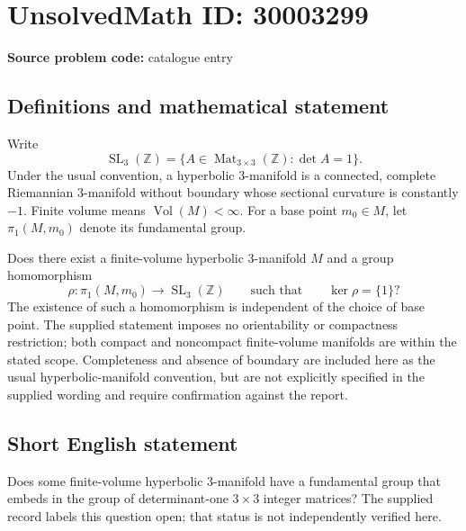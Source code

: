 \documentclass[11pt]{article}
\newcommand{\Z}{\mathbb{Z}}
\begin{document}
\section*{UnsolvedMath ID: 30003299}
\textbf{Source problem code:} catalogue entry
\subsection{Definitions and mathematical statement}
Write
\[
\operatorname{SL}_3(\Z)=\{A\in\operatorname{Mat}_{3\times3}(\Z):\det A=1\}.
\]
Under the usual convention, a hyperbolic \(3\)-manifold is a connected, complete Riemannian \(3\)-manifold without boundary whose sectional curvature is constantly \(-1\). Finite volume means \(\operatorname{Vol}(M)<\infty\). For a base point \(m_0\in M\), let \(\pi_1(M,m_0)\) denote its fundamental group.

Does there exist a finite-volume hyperbolic \(3\)-manifold \(M\) and a group homomorphism
\[
\rho:\pi_1(M,m_0)\longrightarrow\operatorname{SL}_3(\Z)
\qquad\text{such that}\qquad
\ker\rho=\{1\}?
\]
The existence of such a homomorphism is independent of the choice of base point. The supplied statement imposes no orientability or compactness restriction; both compact and noncompact finite-volume manifolds are within the stated scope. Completeness and absence of boundary are included here as the usual hyperbolic-manifold convention, but are not explicitly specified in the supplied wording and require confirmation against the report.
\subsection{Short English statement}
Does some finite-volume hyperbolic \(3\)-manifold have a fundamental group that embeds in the group of determinant-one \(3\times3\) integer matrices? The supplied record labels this question open; that status is not independently verified here.
\end{document}

